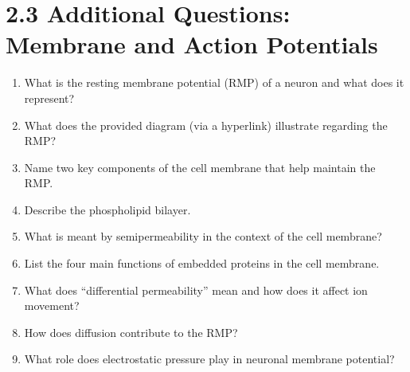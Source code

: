 \section*{2.3 Additional Questions: Membrane and Action Potentials}
\begin{enumerate}[label=\textbf{Q2.3.\arabic*}]
      \item What is the resting membrane potential (RMP) of a neuron and what does it represent? \\
      \item What does the provided diagram (via a hyperlink) illustrate regarding the RMP? \\
      \item Name two key components of the cell membrane that help maintain the RMP. \\
      \item Describe the phospholipid bilayer. \\
      \item What is meant by semipermeability in the context of the cell membrane? \\
      \item List the four main functions of embedded proteins in the cell membrane. \\
      \item What does “differential permeability” mean and how does it affect ion movement? \\
      \item How does diffusion contribute to the RMP? \\
      \item What role does electrostatic pressure play in neuronal membrane potential? \\

\end{enumerate}
